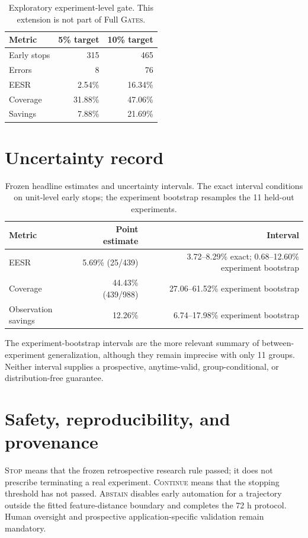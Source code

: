 \documentclass[11pt,twocolumn]{article}
\newcommand{\method}{\textsc{Gates}\xspace}
\newcommand{\stopstate}{\textsc{Stop}\xspace}
\newcommand{\continuestate}{\textsc{Continue}\xspace}
\newcommand{\abstainstate}{\textsc{Abstain}\xspace}
\begin{document}
\begin{table}[H]
\centering
\caption{Exploratory experiment-level gate. This extension is not part of Full \method.}
\label{tab:expgate}
\normalsize
\begin{tabular}{@{}lrr@{}}
\toprule
Metric & 5\% target & 10\% target \\
\midrule
Early stops & 315 & 465 \\
Errors & 8 & 76 \\
EESR & 2.54\% & 16.34\% \\
Coverage & 31.88\% & 47.06\% \\
Savings & 7.88\% & 21.69\% \\
\bottomrule
\end{tabular}
\end{table}

\section{Uncertainty record}

\begin{table}[H]
\centering
\caption{Frozen headline estimates and uncertainty intervals. The exact interval conditions on
unit-level early stops; the experiment bootstrap resamples the 11 held-out experiments.}
\label{tab:uncertainty}
\normalsize
\begin{tabular}{@{}lrr@{}}
\toprule
Metric & Point estimate & Interval \\
\midrule
EESR & 5.69\% (25/439) & 3.72--8.29\% exact; 0.68--12.60\% experiment bootstrap \\
Coverage & 44.43\% (439/988) & 27.06--61.52\% experiment bootstrap \\
Observation savings & 12.26\% & 6.74--17.98\% experiment bootstrap \\
\bottomrule
\end{tabular}
\end{table}

The experiment-bootstrap intervals are the more relevant summary of between-experiment
generalization, although they remain imprecise with only 11 groups. Neither interval supplies a
prospective, anytime-valid, group-conditional, or distribution-free guarantee.

\clearpage
\section{Safety, reproducibility, and provenance}

\stopstate means that the frozen retrospective research rule passed; it does not prescribe
terminating a real experiment. \continuestate means that the stopping threshold has not passed.
\abstainstate disables early automation for a trajectory outside the fitted feature-distance
boundary and completes the 72 h protocol. Human oversight and prospective application-specific
validation remain mandatory.
\end{document}
